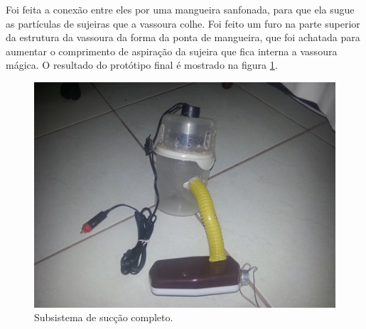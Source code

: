 		Foi feita a conexão entre eles por uma mangueira sanfonada, para que ela sugue as partículas de sujeiras que a vassoura colhe. Foi feito um furo na parte superior da estrutura da vassoura da forma da ponta de mangueira, que foi achatada para aumentar o comprimento de aspiração da sujeira que fica interna a vassoura mágica. O resultado do protótipo final é mostrado na figura \ref{img:sistema_completo}.

		\begin{figure}[H]
			\centering
			\includegraphics[scale=1]{figuras/asppc2_13.jpg}
			\caption{Subsistema de sucção completo.}
			\label{img:sistema_completo}
		\end{figure}


